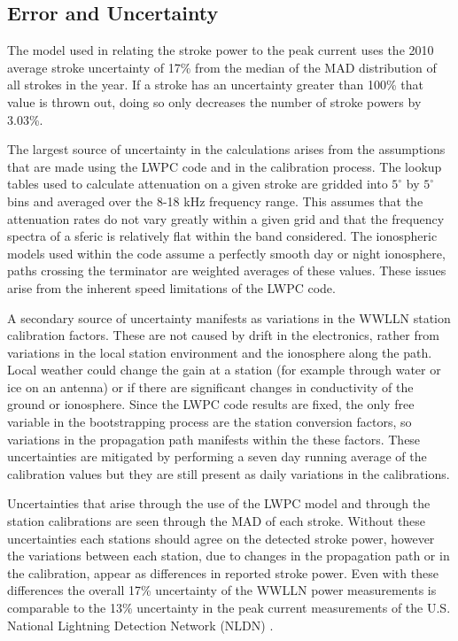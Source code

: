 \subsection{Error and Uncertainty}

The model used in relating the stroke power to the peak current uses the 2010 average stroke uncertainty of 17\% from the median of the MAD distribution of all strokes in the year.
If a stroke has an uncertainty greater than 100\% that value is thrown out, doing so only decreases the number of stroke powers by 3.03\%.

The largest source of uncertainty in the calculations arises from the assumptions that are made using the LWPC code and in the calibration process.
The lookup tables used to calculate attenuation on a given stroke are gridded into $5^{\circ}$ by $5^{\circ}$ bins and averaged over the 8-18 kHz frequency range.
This assumes that the attenuation rates do not vary greatly within a given grid and that the frequency spectra of a sferic is relatively flat within the band considered.
The ionospheric models used within the code assume a perfectly smooth day or night ionosphere, paths crossing the terminator are weighted averages of these values.
These issues arise from the inherent speed limitations of the LWPC code.

A secondary source of uncertainty manifests as variations in the WWLLN station calibration factors.
These are not caused by drift in the electronics, rather from variations in the local station environment and the ionosphere along the path.
Local weather could change the gain at a station (for example through water or ice on an antenna) or if there are significant changes in conductivity of the ground or ionosphere.
Since the LWPC code results are fixed, the only free variable in the bootstrapping process are the station conversion factors, so variations in the propagation path manifests within the these factors.
These uncertainties are mitigated by performing a seven day running average of the calibration values but they are still present as daily variations in the calibrations.

Uncertainties that arise through the use of the LWPC model and through the station calibrations are seen through the MAD of each stroke.
Without these uncertainties each stations should agree on the detected stroke power, however the variations between each station, due to changes in the propagation path or in the calibration, appear as differences in reported stroke power.
Even with these differences the overall 17\% uncertainty of the WWLLN power measurements is comparable to the 13\% uncertainty in the peak current measurements of the U.S. National Lightning Detection Network (NLDN) \citep{Nag2011}.

